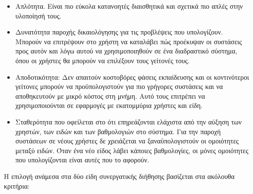 \begin{itemize}
 \item Απλότητα. Είναι πιο εύκολα κατανοητές διαισθητικά και σχετικά πιο απλές στην υλοποίησή τους. 
 \item Δυνατότητα παροχής δικαιολόγησης για τις προβλέψεις που υπολογίζουν. Μπορούν να επιτρέψουν στο χρήστη να καταλάβει πώς προέκυψαν οι συστάσεις προς αυτόν και λόγω αυτού να χρησιμοποιηθούν σε ένα διαδραστικό σύστημα, όπου οι χρήστες θα μπορούν να επιλέξουν τους γείτονές τους. 
 \item Αποδοτικότητα: Δεν απαιτούν κοστοβόρες φάσεις εκπαίδευσης και οι κοντινότεροι γείτονες μπορούν να προϋπολογιστούν για πιο γρήγορες συστάσεις και να αποθηκευτούν με μικρό κόστος στη μνήμη. Αυτό τους επιτρέπει να χρησιμοποιούνται σε εφαρμογές με εκατομμύρια χρήστες και είδη.
 \item Σταθερότητα που οφείλεται στο ότι επηρεάζονται ελάχιστα από την αύξηση των χρηστών, των ειδών και των βαθμολογιών στο σύστημα. Για την παροχή συστάσεων σε νέους χρήστες δε χρειάζεται να ξαναϋπολογιστούν οι ομοιότητες μεταξύ ειδών. Όταν ένα νέο είδος λάβει κάποιες βαθμολογίες, οι μόνες ομοιότητες που υπολογίζονται είναι αυτές που το αφορούν.
\end{itemize}
Η επιλογή ανάμεσα στα δύο είδη συνεργατικής διήθησης βασίζεται στα ακόλουθα κριτήρια\cite{ricci2011recommender}:
